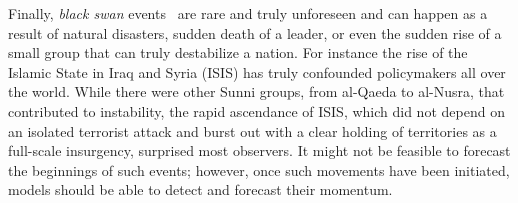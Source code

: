 Finally, {\it black swan} events~\cite{taleb-book} are rare and truly unforeseen and can happen as a
result of natural disasters, sudden death of a leader, or even the sudden rise of a
small group that can truly destabilize a nation.  For instance the rise of the
Islamic State in Iraq and Syria (ISIS) has truly confounded policymakers all over the world.
While there were other Sunni groups, from al-Qaeda to al-Nusra, that contributed to
instability, the rapid ascendance of ISIS, which did not depend on an isolated terrorist attack and
burst out with a clear holding of territories as a full-scale insurgency, surprised most observers.
It might not be feasible to forecast the beginnings of such events; however, once such movements
have been initiated, models should be able to detect and forecast their momentum.




